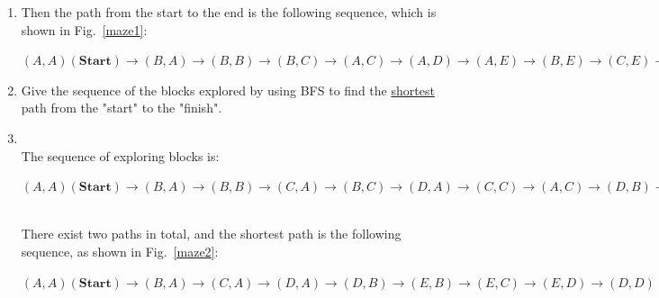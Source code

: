 \documentclass[12pt,a4paper]{article}
\makeatletter
\newtheorem*{solution}{Solution}
\theoremstyle{definition}
\renewenvironment{solution}[1][Solution] {\par\pushQED{\qed}\normalfont\topsep6\p@\@plus6\p@\relax\trivlist\item[\hskip\labelsep\bfseries#1\@addpunct{.}]\ignorespaces}{\popQED\endtrivlist\@endpefalse} \makeatother
\makeatother
\begin{document}
\begin{enumerate}
\begin{enumerate}
\begin{solution}
        Then the path from the start to the end is the following sequence, which is shown in Fig.~\ref{maze1}:
        
        $
        (A,A)(\mathbf{Start})\rightarrow (B,A) \rightarrow (B,B) \rightarrow (B,C) \rightarrow (A,C) \rightarrow (A,D)\rightarrow (A,E) \rightarrow (B,E) \rightarrow (C,E) \rightarrow (D,E) \rightarrow (D,D)(\mathbf{Finish})
        $
        
        \end{solution}
        
        \item Give the sequence of the blocks explored by using BFS to find the \underline{shortest} path from the "start" to the "finish".
        \begin{solution}
        ~\\
        The sequence of exploring blocks is:
        
        $
        (A,A)(\mathbf{Start}) \rightarrow (B,A) \rightarrow (B,B) \rightarrow (C,A) \rightarrow (B,C) \rightarrow (D,A) \rightarrow (C,C) \rightarrow (A,C) \rightarrow (D,B) \rightarrow (A,D) \rightarrow (E,B) \rightarrow (A,E) \rightarrow (E,C) \rightarrow (B,E) \rightarrow (E,D) \rightarrow (C,E) \rightarrow (D,D)(\mathbf{1st\ path\ reaches\ the\ final.}) \rightarrow (D,E) \rightarrow (D,D)(\mathbf{2nd\ path\ reaches\ the\ final})
        $
        
        ~\\
        There exist two paths in total, and the shortest path is the following sequence, as shown in Fig.~\ref{maze2}:
        
        $
        (A,A)(\mathbf{Start}) \rightarrow (B,A) \rightarrow (C,A) \rightarrow (D,A) \rightarrow (D,B) \rightarrow (E,B) \rightarrow (E,C) \rightarrow (E,D) \rightarrow (D,D)(\mathbf{Finish})
        $
        

\end{solution}
\end{enumerate}
\end{enumerate}
\end{document}
